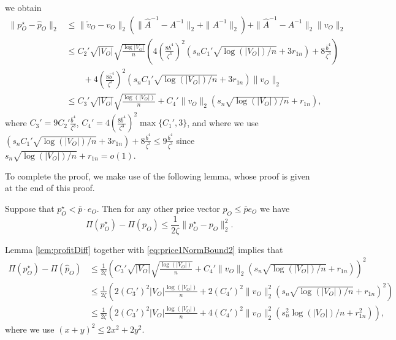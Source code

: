 \documentclass[opre,nonblindrev]{informs3} %
\begin{document}
\begin{APPENDIX}{}
   we obtain
   \begin{equation}\label{eq:price1NormBound2}
   \begin{aligned}
   \|   {{p}}_O^\star- \hat{{p}}_O \| _2  & \leq
   \|  \check{{{v}}}_O -{{v}}_O  \|_2 ( \| \hat A^{-1} - A^{-1}\|_2 + \|A^{-1}\|_2  )
   +  \| \hat A^{-1} - A^{-1} \|_2  \|{{v}}_O\|_2 \\
   &\leq C_2'
   \sqrt{|V_O|}\sqrt{\frac{\log |V_O|}{n}} \left(
   4\left(\frac{8\bar{b}^4}{\zeta^3}\right)^2
   \left(     s_n C_1' \sqrt{\log(|V_O|)/n} + 3 r_{1n}\right) +8\frac{\bar{b}^4}{\zeta^3}\right)\\
   & \qquad	+ 	  4\left(\frac{8\bar{b}^4}{\zeta^3}\right)^2
   \left(     s_nC_1' \sqrt{\log(|V_O|)/n} + 3 r_{1n}\right)  \|{{v}}_O\|_2 \\
   &\leq C_3' \sqrt{|V_O|}  \sqrt{\frac{{\log(|V_O|)}}{n}} + 
    C_4' \|{v}_O\|_2  \left(     s_n \sqrt{\log(|V_O|)/n} +  r_{1n}  \right),
   \end{aligned}
   \end{equation}
   where $C_3' = 9C_2'\frac{\bar{b}^4}{\zeta^3}$, $C_4' =4 
   \left(\frac{8\bar{b}^4}{\zeta^3}\right)^2
   \max\{C_1',3\}$,
   and where we use
   $\left(     s_n C_1' \sqrt{\log(|V_O|)/n} + 3 r_{1n}\right) +8\frac{\bar{b}^4}{\zeta^3}\leq 9\frac{\bar{b}^4}{\zeta^3}$ since  
  $ s_n  \sqrt{\log(|V_O|)/n} +  r_{1n}=o(1)$.

To complete the proof, we make use of the following lemma, whose proof is given at the end of this proof.
   \begin{lemma} \label{lem:profitDiff}
   	Suppose that ${p}_O^\star< \bar{p} \cdot {e}_O$. Then
   	for any other price vector ${p}_O\leq \bar{p} {e}_O$ we have
   	\begin{equation}
   	\Pi({p}_O^\star)-\Pi({p}_O) \leq \frac{1}{2\zeta}  \| {p}_O^\star - {p}_O\|_2^2.
   	\end{equation}
   \end{lemma}



   Lemma \ref{lem:profitDiff}
   together with \eqref{eq:price1NormBound2} implies that
   \begin{equation}\label{eq:finalProfitBound}
   \begin{aligned}
   \Pi({{p}}^\star_O) -\Pi(\hat{{p}}_O) &\leq
   \frac{1}{2\zeta} \left(C_3' \sqrt{|V_O|}  \sqrt{\frac{{\log(|V_O|)}}{n}} + C_4'  \|{v}_O\|_2 \left(     s_n \sqrt{\log(|V_O|)/n} +  r_{1n}  \right) \right)^2 \\
   &\leq
   \frac{1}{2\zeta} \left( 2(C_3')^2 {|V_O|} \frac{{\log(|V_O|)}}{n}
   + 2  (C_4')^2 \|{v}_O\|_2^2 \left(     s_n \sqrt{\log(|V_O|)/n} +  r_{1n}  \right)^2
   \right)\\
   &\leq
   \frac{1}{2\zeta} \left( 2(C_3')^2 {|V_O|} \frac{{\log(|V_O|)}}{n}
   + 4  (C_4')^2 \|{v}_O\|_2^2 \left(     s_n^2 {\log(|V_O|)/n} +  r_{1n}^2  \right)
   \right),
   \end{aligned}
   \end{equation}
   where we use $(x+y)^2 \leq 2 x^2 + 2 y^2$.



\end{APPENDIX}
\end{document}
